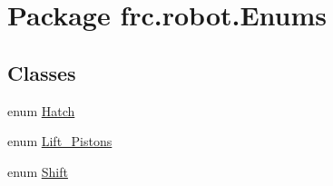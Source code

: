 \hypertarget{namespacefrc_1_1robot_1_1_enums}{}\section{Package frc.\+robot.\+Enums}
\label{namespacefrc_1_1robot_1_1_enums}
\subsection*{Classes}
\begin{DoxyCompactItemize}
\item 
enum \hyperlink{enumfrc_1_1robot_1_1_enums_1_1_hatch}{Hatch}
\item 
enum \hyperlink{enumfrc_1_1robot_1_1_enums_1_1_lift___pistons}{Lift\+\_\+\+Pistons}
\item 
enum \hyperlink{enumfrc_1_1robot_1_1_enums_1_1_shift}{Shift}
\end{DoxyCompactItemize}
